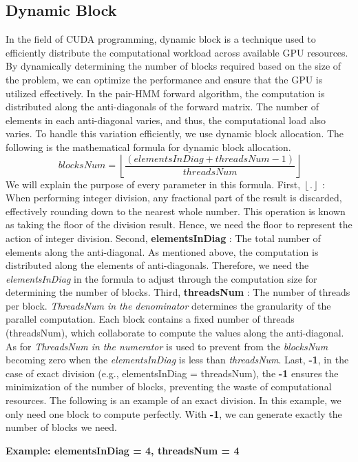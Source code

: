 \documentclass[PhD]{PHlab-thesis}
\begin{document}
\subsection{Dynamic Block}
In the field of CUDA programming, dynamic block is a technique used to efficiently distribute the computational workload across available GPU resources. By dynamically determining the number of blocks required based on the size of the problem, we can optimize the performance and ensure that the GPU is utilized effectively.
In the pair-HMM forward algorithm, the computation is distributed along the anti-diagonals of the forward matrix. The number of elements in each anti-diagonal varies, and thus, the computational load also varies. To handle this variation efficiently, we use dynamic block allocation. The following is the mathematical formula for dynamic block allocation.
\[
\ blocksNum = \left\lfloor \frac{(elementsInDiag + threadsNum- 1) }{threadsNum} \right\rfloor
\]
We will explain the purpose of every parameter in this formula. First,  $\left\lfloor.\right\rfloor$ : When performing integer division, any fractional part of the result is discarded, effectively rounding down to the nearest whole number. This operation is known as taking the floor of the division result. Hence, we need the floor to represent the action of integer division. Second, \textbf{elementsInDiag} : The total number of elements along the anti-diagonal. As mentioned above, the computation is distributed along the elements of anti-diagonals. Therefore, we need the \textit{elementsInDiag} in the formula to adjust through the computation size for determining the number of blocks. Third, \textbf{threadsNum} : The number of threads per block. \textit{ThreadsNum in the denominator} determines the granularity of the parallel computation. Each block contains a fixed number of threads (threadsNum), which collaborate to compute the values along the anti-diagonal.   As for \textit{ThreadsNum in the numerator} is used to prevent from the \textit{blocksNum} becoming zero when the \textit{elementsInDiag} is less than \textit{threadsNum}. Last, \textbf{-1}, in the case of exact division (e.g., elementsInDiag = threadsNum), the \textbf{-1} ensures the minimization of the number of blocks, preventing the waste of computational resources. The following is an example of an exact division. In this example, we only need one block to compute perfectly. With \textbf{-1}, we can generate exactly the number of blocks we need.

\textbf{Example: elementsInDiag = 4, threadsNum = 4}
\end{document}
